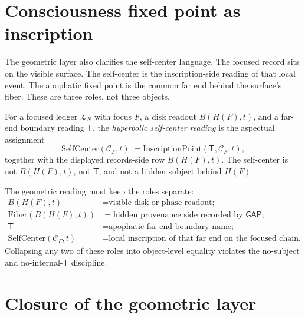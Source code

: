 \section{Consciousness fixed point as inscription}
\label{sec:hyperbolic-consciousness-fixed-point}

The geometric layer also clarifies the self-center language. The focused record sits on the visible surface. The self-center is the inscription-side reading of that local event. The apophatic fixed point is the common far end behind the surface's fiber. These are three roles, not three objects.

\begin{definition}
\label{def:hyperbolic-self-center-reading}
For a focused ledger $\mathcal{L}_N$ with focus $F$, a disk readout $B(H(F),t)$, and a far-end boundary reading $\mathsf{T}$, the \emph{hyperbolic self-center reading} is the aspectual assignment
$$
\mathrm{SelfCenter}(\mathcal{C}_F,t)
:=
\mathrm{InscriptionPoint}(\mathsf{T},\mathcal{C}_F,t),
$$
together with the displayed records-side row $B(H(F),t)$. The self-center is not $B(H(F),t)$, not $\mathsf{T}$, and not a hidden subject behind $H(F)$.
\end{definition}

\begin{principle}
\label{prin:hyperbolic-three-role-discipline}
The geometric reading must keep the roles separate:
$$
\begin{aligned}
B(H(F),t) &= \text{visible disk or phase readout;}\\
\mathrm{Fiber}(B(H(F),t)) &= \text{hidden provenance side recorded by }\mathsf{GAP};\\
\mathsf{T} &= \text{apophatic far-end boundary name;}\\
\mathrm{SelfCenter}(\mathcal{C}_F,t) &= \text{local inscription of that far end on the focused chain.}
\end{aligned}
$$
Collapsing any two of these roles into object-level equality violates the no-subject and no-internal-$\mathsf{T}$ discipline.
\end{principle}

\section{Closure of the geometric layer}
\label{sec:hyperbolic-closure}

